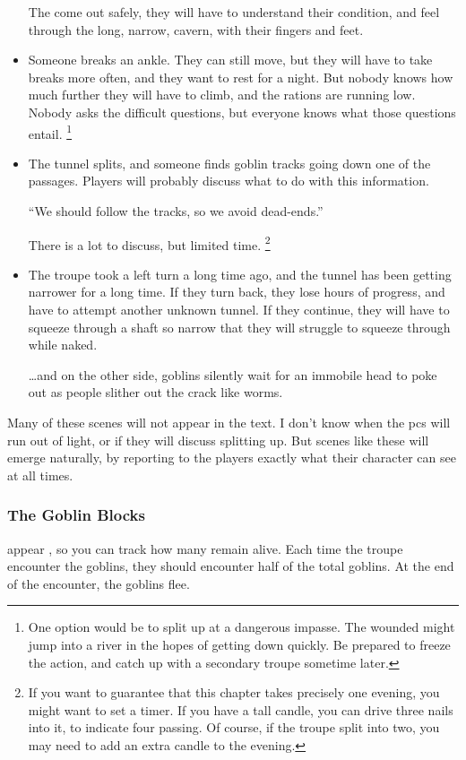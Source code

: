 \begin{multicols}{2}
\begin{itemize}
	The come out safely, they will have to understand their condition, and feel through the long, narrow, cavern, with their fingers and feet.
	\item
	Someone breaks an ankle.
	They can still move, but they will have to take breaks more often, and they want to rest for a night.
	But nobody knows how much further they will have to climb, and the rations are running low.
	Nobody asks the difficult questions, but everyone knows what those questions entail.%
	\footnote{One option would be to split up at a dangerous impasse.
	The wounded might jump into a river in the hopes of getting down quickly.
	Be prepared to freeze the action, and catch up with a secondary troupe sometime later.}
	\item
	The tunnel splits, and someone finds goblin tracks going down one of the passages.
	Players will probably discuss what to do with this information.
	\begin{speechtext}
		``We should follow the tracks, so we avoid dead-ends.''
	\end{speechtext}
	There is a lot to discuss, but limited time.%
	\footnote{If you want to guarantee that this chapter takes precisely one evening, you might want to set a timer.
	If you have a tall candle, you can drive three nails into it, to indicate four  passing.
	Of course, if the troupe split into two, you may need to add an extra candle to the evening.}
	\item
	The troupe took a left turn a long time ago, and the tunnel has been getting narrower for a long time.
	If they turn back, they lose hours of progress, and have to attempt another unknown tunnel.
	If they continue, they will have to squeeze through a shaft so narrow that they will struggle to squeeze through while naked.

	\ldots and on the other side, goblins silently wait for an immobile head to poke out as people slither out the crack like worms.
\end{itemize}

Many of these scenes will not appear in the text.
I don't know when the \glspl{pc} will run out of light, or if they will discuss splitting up.
But scenes like these will emerge naturally, by reporting to the players exactly what their character can see at all times.

\subsubsection{The Goblin Blocks}
appear , so you can track how many remain alive.
Each time the troupe encounter the goblins, they should encounter half of the total goblins.
At the end of the encounter, the goblins flee.

\end{multicols}
